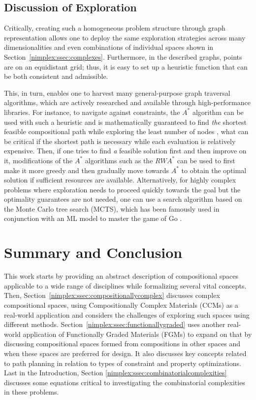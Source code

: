 \subsection{Discussion of Exploration} \label{nimplex:sec:discussion}

Critically, creating such a homogeneous problem structure through graph representation allows one to deploy the same exploration strategies across many dimensionalities and even combinations of individual spaces shown in Section~\ref{nimplex:ssec:complexes}. Furthermore, in the described graphs, points are on an equidistant grid; thus, it is easy to set up a heuristic function that can be both consistent and admissible. 

This, in turn, enables one to harvest many general-purpose graph traversal algorithms, which are actively researched and available through high-performance libraries. For instance, to navigate against constraints, the $A^*$ algorithm \cite{Hart1968APaths} can be used with such a heuristic and is mathematically guaranteed to find \textit{the} shortest feasible compositional path while exploring the least number of nodes \cite{Dechter1985GeneralizedA}, what can be critical if the shortest path is necessary while each evaluation is relatively expensive. Then, if one tries to find \emph{a} feasible solution first and then improve on it, modifications of the $A^*$ algorithms such as the $RWA^*$ \cite{Bhatia2021OnA} can be used to first make it more greedy and then gradually move towards $A^*$ to obtain the optimal solution if sufficient resources are available. Alternatively, for highly complex problems where exploration needs to proceed quickly towards the goal but the optimality guarantees are not needed, one can use a search algorithm based on the Monte Carlo tree search (MCTS), which has been famously used in conjunction with an ML model to master the game of Go \cite{Silver2016MasteringSearch}.



\section{Summary and Conclusion} \label{nimplex:sec:summary}

This work starts by providing an abstract description of compositional spaces applicable to a wide range of disciplines while formalizing several vital concepts. Then, Section~\ref{nimplex:ssec:compositionallycomplex} discusses complex compositional spaces, using Compositionally Complex Materials (CCMs) as a real-world application and considers the challenges of exploring such spaces using different methods. Section~\ref{nimplex:ssec:functionallygraded} uses another real-world application of Functionally Graded Materials (FGMs) to expand on that by discussing compositional spaces formed from compositions in other spaces and when these spaces are preferred for design. It also discusses key concepts related to path planning in relation to types of constraint and property optimizations. Last in the Introduction, Section \ref{nimplex:ssec:combinatorialcomplexities} discusses some equations critical to investigating the combinatorial complexities in these problems.

